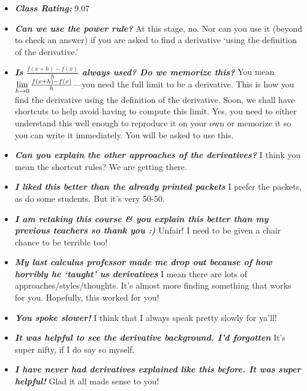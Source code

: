 \documentclass[11pt,letterpaper]{article}
\begin{document}
\begin{itemize}
\item {\bfseries\itshape Class Rating:} 9.07

\item {\bfseries\itshape Can we use the power rule?} At this stage, no. Nor can you use it (beyond to check an answer) if you are asked to find a derivative `using the definition of the derivative.'

\item {\bfseries\itshape Is $\tfrac{f(x + h) - f(x)}{h}$ always used? Do we memorize this?} You mean $\displaystyle\lim_{h \to 0} \tfrac{f(x + h) - f(x)}{h}$---you need the full limit to be a derivative. This is how you find the derivative using the definition of the derivative. Soon, we shall have shortcuts to help avoid having to compute this limit. Yes, you need to either understand this well enough to reproduce it on your own or memorize it so you can write it immediately. You will be asked to use this.

\item {\bfseries\itshape Can you explain the other approaches of the derivatives?} I think you mean the shortcut rules? We are getting there.

\item {\bfseries\itshape I liked this better than the already printed packets} I prefer the packets, as do some students. But it's very 50-50. 

\item {\bfseries\itshape I am retaking this course \& you explain this better than my previous teachers so thank you :) } Unfair! I need to be given a chair chance to be terrible too!

\item {\bfseries\itshape My last calculus professor made me drop out because of how horribly he `taught' us derivatives} I mean there are lots of approaches/styles/thoughts. It's almost more finding something that works for you. Hopefully, this worked for you!

\item {\bfseries\itshape You spoke slower!} I think that I always speak pretty slowly for ya'll!

\item {\bfseries\itshape It was helpful to see the derivative background. I'd forgotten} It's super nifty, if I do say so myself. 

\item {\bfseries\itshape I have never had derivatives explained like this before. It was super helpful!} Glad it all made sense to you!


\end{itemize}
\end{document}
